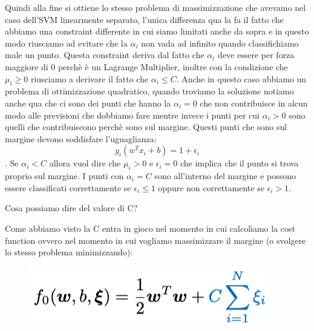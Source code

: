 \documentclass[14pt]{extreport}
\begin{document}
Quindi alla fine si ottiene lo stesso problema di massimizzazione che avevamo nel caso dell'SVM linearmente separato, l'unica differenza qua la fa il
fatto che abbiamo una constraint differente in cui siamo limitati anche da sopra e in questo modo riusciamo ad evitare che la $\alpha_i$ non vada ad
infinito quando classifichiamo male un punto. Questa constraint deriva dal fatto che $\alpha_i$ deve essere per forza maggiore di 0 perchè è un
Lagrange Multiplier, inoltre con la condizione che $\mu_i \geq 0$ riusciamo a derivare il fatto che $\alpha_i \leq C$. Anche in questo caso abbiamo un
problema di ottimizzazione quadratico, quando troviamo la soluzione notiamo anche qua che ci sono dei punti che hanno la $\alpha_i = 0$ che non
contribuisce in alcun modo alle previsioni che dobbiamo fare mentre invece i punti per cui $\alpha_i > 0$ sono quelli che contribuiscono perchè sono
sul margine. Questi punti che sono sul margine devono soddisfare l'uguaglianza:
$$y_i(w^Tx_i+b)=1+\epsilon_i$$. Se $\alpha_i < C$ allora vuol dire che $\mu_i > 0$ e $\epsilon_i = 0$ che implica che il punto si trova proprio sul
margine. I punti con $\alpha_i=C$ sono all'interno del margine e possono essere classificati correttamente se $\epsilon_i \leq 1$ oppure non
correttamente se $\epsilon_i > 1$.

Cosa possiamo dire del valore di C?


Come abbiamo visto la C entra in gioco nel momento in cui calcoliamo la cost function ovvero nel momento in cui vogliamo massimizzare il margine (o
svolgere lo stesso problema minimizzando):

\begin{figure}[H]
\centering
\includegraphics[width=0.5\linewidth]{325.jpeg}
\end{figure}
\end{document}
